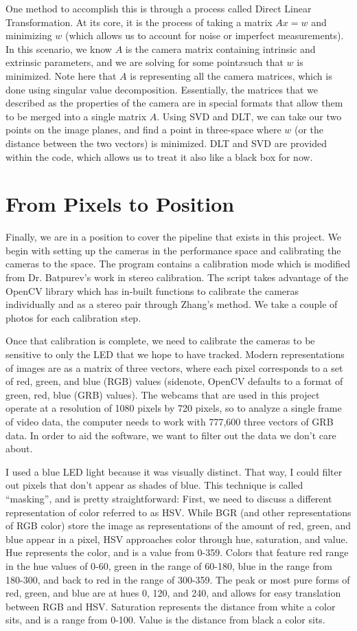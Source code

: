 \documentclass[
    12pt,
    twoside,
    bibstyle=chicago,
    headerstyle=uppercase,
	bibfile=thesis.bib
]{reedthesis}
\begin{document}
	One method to accomplish this is through a process called Direct Linear Transformation. At its core, it is the process of taking a matrix $Ax = w$ and minimizing $w$ (which allows us to account for noise or imperfect measurements). In this scenario, we know $A$ is the camera matrix containing intrinsic and extrinsic parameters, and we are solving for some point$x$such that $w$ is minimized. Note here that $A$ is representing all the camera matrices, which is done using singular value decomposition. Essentially, the matrices that we described as the properties of the camera are in special formats that allow them to be merged into a single matrix $A$. Using SVD and DLT, we can take our two points on the image planes, and find a point in three-space where $w$ (or the distance between the two vectors) is minimized. DLT and SVD are provided within the code, which allows us to treat it also like a black box for now.

\section{From Pixels to Position}
Finally, we are in a position to cover the pipeline that exists in this project. We begin with setting up the cameras in the performance space and calibrating the cameras to the space. The program contains a calibration mode which is modified from Dr. Batpurev's work in stereo calibration. The script takes advantage of the OpenCV library which has in-built functions to calibrate the cameras individually and as a stereo pair through Zhang's method. We take a couple of photos for each calibration step.

Once that calibration is complete, we need to calibrate the cameras to be sensitive to only the LED that we hope to have tracked. Modern representations of images are as a matrix of three vectors, where each pixel corresponds to a set of red, green, and blue (RGB) values (sidenote, OpenCV defaults to a format of green, red, blue (GRB) values). The webcams that are used in this project operate at a resolution of 1080 pixels by 720 pixels, so to analyze a single frame of video data, the computer needs to work with 777,600 three vectors of GRB data. In order to aid the software, we want to filter out the data we don't care about.

I used a blue LED light because it was visually distinct. That way, I could filter out pixels that don't appear as shades of blue. This technique is called “masking”, and is pretty straightforward: First, we need to discuss a different representation of color referred to as HSV. While BGR (and other representations of RGB color) store the image as representations of the amount of red, green, and blue appear in a pixel, HSV approaches color through hue, saturation, and value. Hue represents the color, and is a value from 0-359. Colors that feature red range in the hue values of 0-60, green in the range of 60-180, blue in the range from 180-300, and back to red in the range of 300-359. The peak or most pure forms of red, green, and blue are at hues 0, 120, and 240, and allows for easy translation between RGB and HSV. Saturation represents the distance from white a color sits, and is a range from 0-100. Value is the distance from black a color sits.
\end{document}
